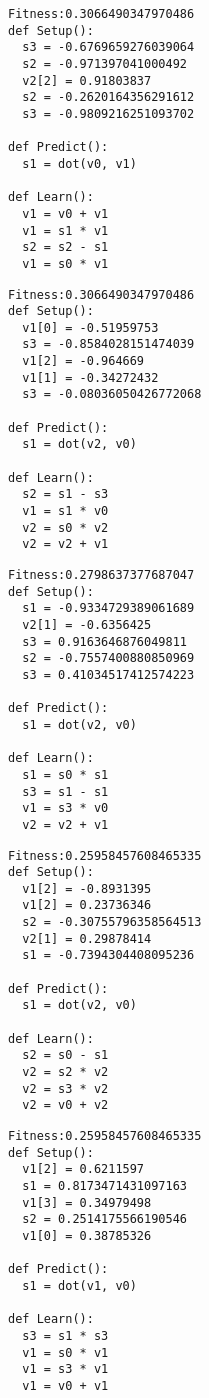 \documentclass[twocolumn, a4j]{jarticle}
\begin{document}
\begin{lstlisting}[caption= No. 0.26]
Fitness:0.3066490347970486 
def Setup():
  s3 = -0.6769659276039064
  s2 = -0.971397041000492
  v2[2] = 0.91803837
  s2 = -0.2620164356291612
  s3 = -0.9809216251093702

def Predict():
  s1 = dot(v0, v1)

def Learn():
  v1 = v0 + v1
  v1 = s1 * v1
  s2 = s2 - s1
  v1 = s0 * v1

\end{lstlisting}

\newpage

\begin{lstlisting}[caption= No. 0.27]
Fitness:0.3066490347970486 
def Setup():
  v1[0] = -0.51959753
  s3 = -0.8584028151474039
  v1[2] = -0.964669
  v1[1] = -0.34272432
  s3 = -0.08036050426772068

def Predict():
  s1 = dot(v2, v0)

def Learn():
  s2 = s1 - s3
  v1 = s1 * v0
  v2 = s0 * v2
  v2 = v2 + v1

\end{lstlisting}

\begin{lstlisting}[caption= No. 0.28]
Fitness:0.2798637377687047 
def Setup():
  s1 = -0.9334729389061689
  v2[1] = -0.6356425
  s3 = 0.9163646876049811
  s2 = -0.7557400880850969
  s3 = 0.41034517412574223

def Predict():
  s1 = dot(v2, v0)

def Learn():
  s1 = s0 * s1
  s3 = s1 - s1
  v1 = s3 * v0
  v2 = v2 + v1

\end{lstlisting}

\newpage

\begin{lstlisting}[caption= No. 0.29]
Fitness:0.25958457608465335 
def Setup():
  v1[2] = -0.8931395
  v1[2] = 0.23736346
  s2 = -0.30755796358564513
  v2[1] = 0.29878414
  s1 = -0.7394304408095236

def Predict():
  s1 = dot(v2, v0)

def Learn():
  s2 = s0 - s1
  v2 = s2 * v2
  v2 = s3 * v2
  v2 = v0 + v2

\end{lstlisting}

\begin{lstlisting}[caption= No. 0.30]
Fitness:0.25958457608465335 
def Setup():
  v1[2] = 0.6211597
  s1 = 0.8173471431097163
  v1[3] = 0.34979498
  s2 = 0.2514175566190546
  v1[0] = 0.38785326

def Predict():
  s1 = dot(v1, v0)

def Learn():
  s3 = s1 * s3
  v1 = s0 * v1
  v1 = s3 * v1
  v1 = v0 + v1

\end{lstlisting}
\end{document}
